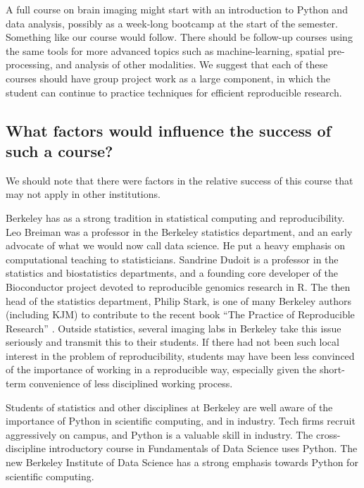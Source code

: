 A full course on brain imaging might start with an introduction to Python and
data analysis, possibly as a week-long bootcamp at the start of the semester.
Something like our course would follow.  There should be follow-up courses
using the same tools for more advanced topics such as machine-learning,
spatial pre-processing, and analysis of other modalities. We suggest that each
of these courses should have group project work as a large component, in which
the student can continue to practice techniques for efficient reproducible
research.

\subsection{What factors would influence the success of such a course?}

We should note that there were factors in the relative success of this
course that may not apply in other institutions.

Berkeley has as a strong tradition in statistical computing and
reproducibility.  Leo Breiman was a professor in the Berkeley statistics
department, and an early advocate of what we would now call data science.  He
put a heavy emphasis on computational teaching to statisticians.  Sandrine
Dudoit is a professor in the statistics and biostatistics departments, and a
founding core developer of the Bioconductor project devoted to reproducible
genomics research in R.  The then head of the statistics department, Philip
Stark, is one of many Berkeley authors (including KJM) to contribute to the
recent book ``The Practice of Reproducible Research''
\citep{kitzes2017practice}. Outside statistics, several imaging labs in
Berkeley take this issue seriously and transmit this to their students.  If
there had not been such local interest in the problem of reproducibility,
students may have been less convinced of the importance of
working in a reproducible way, especially given the short-term convenience
of less disciplined working process.


Students of statistics and other disciplines at Berkeley are well aware of the
importance of Python in scientific computing, and in industry.  Tech firms
recruit aggressively on campus, and Python is a valuable skill in industry.
The cross-discipline introductory course in Fundamentals of Data Science uses
Python. The new Berkeley Institute of Data Science has a strong emphasis
towards Python for scientific computing.

